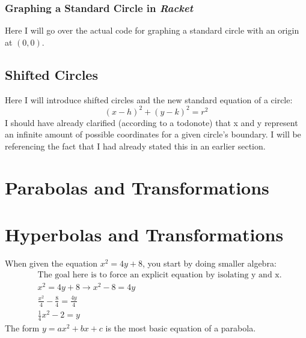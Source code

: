 \documentclass[12pt, letterpaper]{article}
\newcommand{\iRac}{\textit{Racket}}
\begin{document}
	\subsubsection{Graphing a Standard Circle in \iRac}
	Here I will go over the actual code for graphing a standard circle with an origin at \((0,0)\).
	
	\subsection{Shifted Circles}
	Here I will introduce shifted circles and the new standard equation of a circle:
	\begin{equation*}
		(x - h)^2 + (y - k)^2 = r^2
	\end{equation*}
	I should have already clarified (according to a todonote) that x and y represent an infinite amount of possible coordinates for a given circle's boundary. I will be referencing the fact that I had already stated this in an earlier section.
	
	\section{Parabolas and Transformations}
	\section{Hyperbolas and Transformations}
	When given the equation \(x^2 = 4y + 8\), you start by doing smaller algebra:
	\begin{equation*}
	\begin{split}
		&\text{The goal here is to force an explicit equation by isolating y and x.} \\
		&x^2 = 4y + 8 \longrightarrow x^{2}-8 = 4y \\
		&\frac{x^2}{4} -\frac{8}{4} = \frac{4y}{4} \\
		&\frac{1}{4}x^{2} -2 = y
	\end{split}
	\end{equation*}
	The form \(y = ax^2 + bx + c\) is the most basic equation of a parabola.
	
\end{document}

